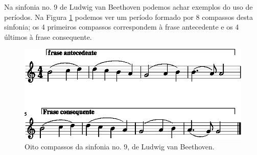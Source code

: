 \begin{example}
Na sinfonia no. 9 de Ludwig van Beethoven podemos achar exemplos do uso de períodos. 
Na Figura \ref{fig:periodo-ex1} podemos ver um período formado por 8 compassos desta sinfonia;
os 4 primeiros compassos correspondem à frase antecedente 
e os 4 últimos à frase consequente.
\end{example}

\begin{figure}[!h]
  \centering
    \includegraphics[width=\textwidth]{chapters/cap-musica-composer/periodo-ex1-1.eps}
\caption{Oito compassos da sinfonia no. 9, de Ludwig van Beethoven.}
\label{fig:periodo-ex1}
\end{figure}


